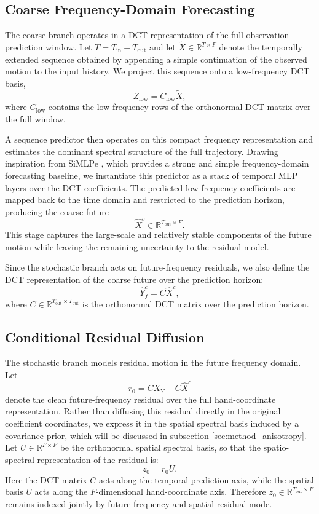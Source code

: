 \documentclass[runningheads]{llncs}
\begin{document}
\subsection{Coarse Frequency-Domain Forecasting}
\label{sec:method_coarse}

The coarse branch operates in a DCT representation of the full observation--prediction window. Let $T = T_{\mathrm{in}} + T_{\mathrm{out}}$ and let $\tilde{X} \in \mathbb{R}^{T \times F}$ denote the temporally extended sequence obtained by appending a simple continuation of the observed motion to the input history. We project this sequence onto a low-frequency DCT basis,
\[
Z_{\mathrm{low}} = C_{\mathrm{low}} \tilde{X},
\]
where $C_{\mathrm{low}}$ contains the low-frequency rows of the orthonormal DCT matrix over the full window.

A sequence predictor then operates on this compact frequency representation and estimates the dominant spectral structure of the full trajectory. Drawing inspiration from SiMLPe \cite{Guo2023SiMLPe}, which provides a strong and simple frequency-domain forecasting baseline, we instantiate this predictor as a stack of temporal MLP layers over the DCT coefficients. The predicted low-frequency coefficients are mapped back to the time domain and restricted to the prediction horizon, producing the coarse future
\[
\hat{X}^{c} \in \mathbb{R}^{T_{\mathrm{out}} \times F}.
\]
This stage captures the large-scale and relatively stable components of the future motion while leaving the remaining uncertainty to the residual model.

Since the stochastic branch acts on future-frequency residuals, we also define the DCT representation of the coarse future over the prediction horizon:
\[
\hat{Y}^{c}_{f} = C \hat{X}^{c},
\]
where $C \in \mathbb{R}^{T_{\mathrm{out}} \times T_{\mathrm{out}}}$ is the orthonormal DCT matrix over the prediction horizon.

\subsection{Conditional Residual Diffusion}
\label{sec:method_diffusion}

The stochastic branch models residual motion in the future frequency domain. Let
\[
r_0 = C X_Y - C \hat{X}^{c}
\]
denote the clean future-frequency residual over the full hand-coordinate representation. Rather than diffusing this residual directly in the original coefficient coordinates, we express it in the spatial spectral basis induced by a covariance prior, which will be discussed in subsection \ref{sec:method_anisotropy}. Let $U \in \mathbb{R}^{F \times F}$ be the orthonormal spatial spectral basis, so that the spatio-spectral representation of the residual is:
\[
z_0 = r_0 U.
\]
Here the DCT matrix $C$ acts along the temporal prediction axis, while the spatial basis $U$ acts along the $F$-dimensional hand-coordinate axis. Therefore $z_0 \in \mathbb{R}^{T_{\mathrm{out}} \times F}$ remains indexed jointly by future frequency and spatial residual mode.
\end{document}
